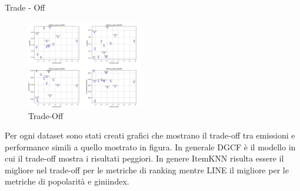 \begin{frame}{Trade - Off}
    \begin{figure}
    \centering
    \includegraphics[width=0.45\textwidth]{images/TradeOff.png}
    \caption{Trade-Off}
\end{figure}

Per ogni dataset sono stati creati grafici che mostrano il trade-off tra emissioni e performance simili a quello mostrato in figura. In generale DGCF è il modello in cui il trade-off mostra i risultati peggiori. In genere ItemKNN risulta essere il migliore nel trade-off per le metriche di ranking mentre LINE il migliore per le metriche di popolarità e giniindex.
\end{frame}
